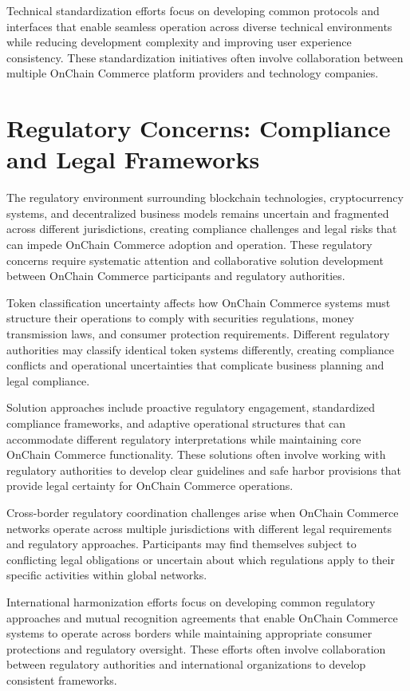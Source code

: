 \documentclass[
  Letterpaper,
]{scrbook}
\begin{document}
Technical standardization efforts focus on developing common protocols
and interfaces that enable seamless operation across diverse technical
environments while reducing development complexity and improving user
experience consistency. These standardization initiatives often involve
collaboration between multiple OnChain Commerce platform providers and
technology companies.

\section{Regulatory Concerns: Compliance and Legal
Frameworks}\label{regulatory-concerns-compliance-and-legal-frameworks}

The regulatory environment surrounding blockchain technologies,
cryptocurrency systems, and decentralized business models remains
uncertain and fragmented across different jurisdictions, creating
compliance challenges and legal risks that can impede OnChain Commerce
adoption and operation. These regulatory concerns require systematic
attention and collaborative solution development between OnChain
Commerce participants and regulatory authorities.

Token classification uncertainty affects how OnChain Commerce systems
must structure their operations to comply with securities regulations,
money transmission laws, and consumer protection requirements. Different
regulatory authorities may classify identical token systems differently,
creating compliance conflicts and operational uncertainties that
complicate business planning and legal compliance.

Solution approaches include proactive regulatory engagement,
standardized compliance frameworks, and adaptive operational structures
that can accommodate different regulatory interpretations while
maintaining core OnChain Commerce functionality. These solutions often
involve working with regulatory authorities to develop clear guidelines
and safe harbor provisions that provide legal certainty for OnChain
Commerce operations.

Cross-border regulatory coordination challenges arise when OnChain
Commerce networks operate across multiple jurisdictions with different
legal requirements and regulatory approaches. Participants may find
themselves subject to conflicting legal obligations or uncertain about
which regulations apply to their specific activities within global
networks.

International harmonization efforts focus on developing common
regulatory approaches and mutual recognition agreements that enable
OnChain Commerce systems to operate across borders while maintaining
appropriate consumer protections and regulatory oversight. These efforts
often involve collaboration between regulatory authorities and
international organizations to develop consistent frameworks.
\end{document}
